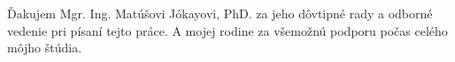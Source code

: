 Ďakujem Mgr. Ing. Matúšovi Jókayovi, PhD. za jeho dôvtipné rady a odborné
vedenie pri písaní tejto práce. A mojej rodine za všemožnú podporu počas celého
môjho štúdia.